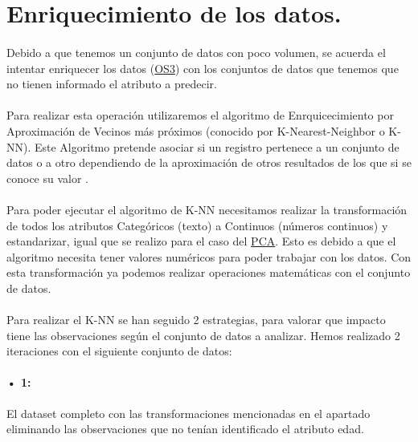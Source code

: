 \section{Enriquecimiento de los datos.}
\label{section:knn}

\paragraph{}
Debido a que tenemos un conjunto de datos con poco volumen, se acuerda el intentar enriquecer los datos (\hyperref[os:OS3]{OS3}) con los conjuntos de datos que tenemos que no tienen informado el atributo a predecir.

\paragraph{}
Para realizar esta operación utilizaremos el algoritmo de Enrquicecimiento por Aproximación de Vecinos más próximos (conocido por K-Nearest-Neighbor o K-NN). Este Algoritmo pretende asociar si un registro pertenece a un conjunto de datos o a otro dependiendo de la aproximación de otros resultados de los que si se conoce su valor \cite{ref:knn_def}.

\paragraph{}
Para poder ejecutar el algoritmo de K-NN necesitamos realizar la transformación de todos los
atributos Categóricos (texto) a Continuos (números continuos) y estandarizar, igual que se realizo para el caso del \hyperref[section:pca_standar]{PCA}. Esto es debido a que el algoritmo necesita tener valores numéricos para poder trabajar con los datos\cite{ref:knn_scaling}. Con esta transformación ya podemos realizar operaciones matemáticas con el conjunto de datos.

\paragraph{}
Para realizar el K-NN se han seguido 2 estrategias, para valorar que impacto tiene las observaciones según el conjunto de datos a analizar. Hemos realizado 2 iteraciones con el siguiente conjunto de datos:

\paragraph{• 1: } El dataset completo con las transformaciones mencionadas en el apartado  eliminando las observaciones que no tenían identificado el atributo edad.

